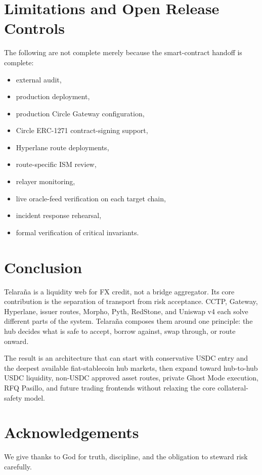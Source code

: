 \documentclass[11pt]{article}
\newcommand{\protocol}{Telara\~na}
\begin{document}
\section{Limitations and Open Release Controls}

The following are not complete merely because the smart-contract handoff is
complete:

\begin{itemize}
  \item external audit,
  \item production deployment,
  \item production Circle Gateway configuration,
  \item Circle ERC-1271 contract-signing support,
  \item Hyperlane route deployments,
  \item route-specific ISM review,
  \item relayer monitoring,
  \item live oracle-feed verification on each target chain,
  \item incident response rehearsal,
  \item formal verification of critical invariants.
\end{itemize}

\section{Conclusion}

\protocol{} is a liquidity web for FX credit, not a bridge aggregator. Its
core contribution is the separation of transport from risk acceptance. CCTP,
Gateway, Hyperlane, issuer routes, Morpho, Pyth, RedStone, and Uniswap v4 each
solve different parts of the system. \protocol{} composes them around one
principle: the hub decides what is safe to accept, borrow against, swap through,
or route onward.

The result is an architecture that can start with conservative USDC entry and
the deepest available fiat-stablecoin hub markets, then expand toward
hub-to-hub USDC liquidity, non-USDC approved asset routes, private Ghost Mode
execution, RFQ Pasillo, and future trading frontends without relaxing the core
collateral-safety model.

\section*{Acknowledgements}

We give thanks to God for truth, discipline, and the obligation to steward risk
carefully.
\end{document}
